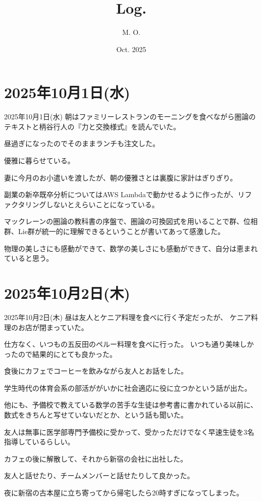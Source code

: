 \documentclass[dvipdfmx, autodetect-engine, aspectratio=169, 10.5pt]{beamer}
\title{
Log.
}
\author{
M. O.
}
\date{Oct. 2025}
\begin{document}
\maketitle

\section{2025年10月1日(水)}

\begin{frame}{2025年10月1日(水)}
	朝はファミリーレストランのモーニングを食べながら圏論のテキストと柄谷行人の『力と交換様式』を読んでいた。

	昼過ぎになったのでそのままランチも注文した。

	優雅に暮らせている。

	妻に今月のお小遣いを渡したが、朝の優雅さとは裏腹に家計はぎりぎり。

	副業の新卒既卒分析についてはAWS Lambdaで動かせるように作ったが、リファクタリングしないとえらいことになっている。

	マックレーンの圏論の教科書の序盤で、圏論の可換図式を用いることで群、位相群、Lie群が統一的に理解できるということが書いてあって感激した。

	物理の美しさにも感動ができて、数学の美しさにも感動ができて、自分は恵まれていると思う。
\end{frame}

\section{2025年10月2日(木)}

\begin{frame}{2025年10月2日(木)}
	昼は友人とケニア料理を食べに行く予定だったが、
	ケニア料理のお店が閉まっていた。

	仕方なく、いつもの五反田のペルー料理を食べに行った。
	いつも通り美味しかったので結果的にとても良かった。

	食後にカフェでコーヒーを飲みながら友人とお話をした。

	学生時代の体育会系の部活ががいかに社会適応に役に立つかという話が出た。

	他にも、予備校で教えている数学の苦手な生徒は参考書に書かれている以前に、数式をきちんと写せていないだとか、という話も聞いた。

	友人は無事に医学部専門予備校に受かって、受かっただけでなく早速生徒を3名指導しているらしい。

	カフェの後に解散して、それから新宿の会社に出社した。

	友人と話せたり、チームメンバーと話せたりして良かった。

	夜に新宿の古本屋に立ち寄ってから帰宅したら20時すぎになってしまった。
\end{frame}
\end{document}

